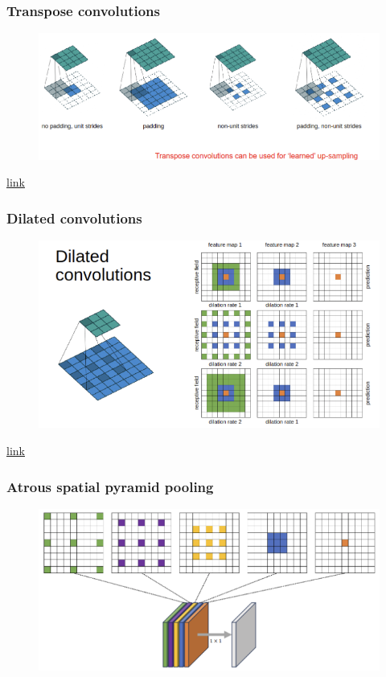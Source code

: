 \documentclass[11pt]{article}
\begin{document}
\subsubsection{Transpose convolutions}

\begin{figure}[H]
    \centering
    \includegraphics[width=.8\linewidth]{figures/transpose-convolutions.png}
\end{figure}

\href{https://github.com/vdumoulin/conv_arithmetic}{link}

\subsubsection{Dilated convolutions}

\begin{figure}[H]
    \centering
    \includegraphics[width=.8\linewidth]{figures/dilated-convolutions.png}
\end{figure}

\href{https://arxiv.org/abs/1511.07122v3}{link}

\subsubsection{Atrous spatial pyramid pooling}

\begin{figure}[H]
    \centering
    \includegraphics[width=.8\linewidth]{figures/atrous-spatial-pooling.png}
\end{figure}
\end{document}
